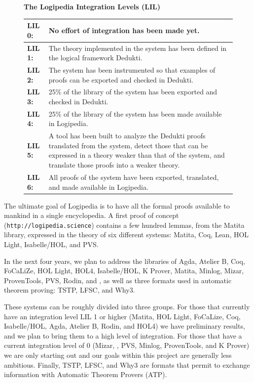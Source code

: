 \begin{figure}[ht]
\begin{shaded}
\begin{center}
{\bf \Large The Logipedia Integration Levels (LIL)\label{lil}}
\end{center}

\begin{longtable}{|p{}|p{}|}
\hline
{\bf LIL 0:} & No effort of integration has been made yet.\\
\hline
{\bf LIL 1:} & The theory implemented in the system has been defined in
the logical framework Dedukti.\\
\hline
{\bf LIL 2:} & The system has been instrumented so that examples of proofs
can be exported and checked in Dedukti.\\
\hline
{\bf LIL 3:} & 25\% of the library of the system has been
exported and checked in Dedukti.\\
\hline
{\bf LIL 4:} & 25\% of the library of the system has
been made available in Logipedia.\\
\hline
{\bf LIL 5:} & A tool has been built to analyze the Dedukti proofs
translated from the system, detect those that can be expressed in a theory
weaker than that of the system, and translate those proofs into a
weaker theory.\\
\hline
{\bf LIL 6:} & All proofs of the system have been exported, translated,
and made available in Logipedia.\\
\hline
\end{longtable}
\end{shaded}
\end{figure}

The ultimate goal of Logipedia is to have all the formal proofs
available to mankind in a single encyclopedia.  A first proof of
concept ({\tt http://logipedia.science}) contains a few hundred
lemmas, from the Matita library, expressed in the theory of six
different systems: Matita, Coq, Lean, HOL Light, Isabelle/HOL, and
PVS.

In the next four years, we plan to address
the libraries of Agda, Atelier B, Coq, FoCaLiZe, HOL Light, HOL4,
Isabelle/HOL, K Prover, Matita, Minlog, Mizar, ProvenTools, PVS,
Rodin, and \tlaplus, as well as three formats used in automatic
theorem proving: TSTP, LFSC, and Why3. 

These systems can be roughly divided into three groups.  For those
that currently have an integration level LIL 1 or higher (Matita, HOL
Light, FoCaLize, Coq, Isabelle/HOL, Agda, Atelier B, Rodin, and HOL4)
we have preliminary results, and we plan to bring them to a high level
of integration.  For those that have a current integration level of 0
(Mizar, \tlaplus, PVS, Minlog, ProvenTools, and K Prover) we are only
starting out and our goals within this project are generally less
ambitious. Finally, TSTP, LFSC, and Why3 are formats that permit
to exchange information with Automatic Theorem Provers (ATP).

